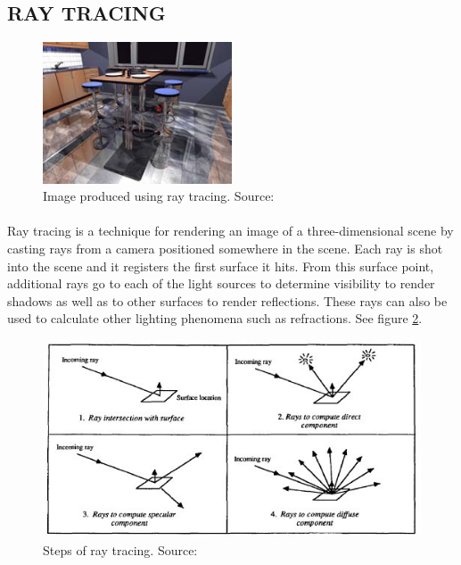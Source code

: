 \subsection{RAY TRACING}

\begin{figure}[h!]
  \centering
    \includegraphics[width=0.5\textwidth]{raytraceSample.jpg}
  \caption{Image produced using ray tracing. Source: \protect\cite{Wald2003}}
	\label{fig:raytraceSample}
\end{figure}

\paragraph{}
Ray tracing is a technique for rendering an image of a three-dimensional scene by casting rays from a camera positioned somewhere in the scene.  Each ray is shot into the scene and it registers the first surface it hits.  From this surface point, additional rays go to each of the light sources to determine visibility to render shadows as well as to other surfaces to render reflections.  These rays can also be used to calculate other lighting phenomena such as refractions.  See figure \ref{fig:raytraceCalc}.

\begin{figure}[h!]
  \centering
    \includegraphics[width=1.0\textwidth]{raytraceCalc.jpg}
  \caption{Steps of ray tracing. Source: \protect\cite{Ward1988}}
	\label{fig:raytraceCalc}
\end{figure}

